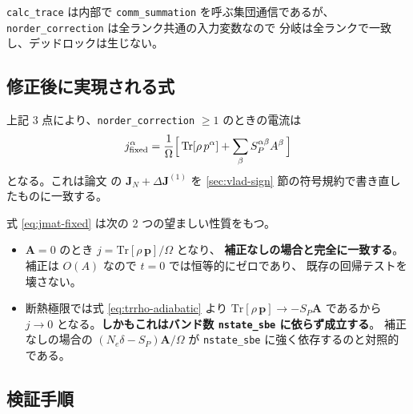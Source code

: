 \documentclass[dvipdfmx,a4paper,11pt]{jsarticle}
\newcommand{\file}[1]{\texttt{#1}}
\newcommand{\vA}{\bm{A}}
\newcommand{\vp}{\bm{p}}
\newcommand{\Tr}{\mathrm{Tr}}
\begin{document}
\verb|calc_trace| は内部で \verb|comm_summation| を呼ぶ集団通信であるが、
\file{norder\_correction} は全ランク共通の入力変数なので
分岐は全ランクで一致し、デッドロックは生じない。

\subsection{修正後に実現される式}

上記 3 点により、\file{norder\_correction} $\ge 1$ のときの電流は
%
\begin{equation}
  j^\alpha_{\text{fixed}}
  = \frac{1}{\Omega}\Bigl[\,\Tr[\rho\,p^\alpha]
    + \sum_\beta S_P^{\alpha\beta}A^\beta \,\Bigr]
  \label{eq:jmat-fixed}
\end{equation}
%
となる。これは論文 \cite{yakovlev2017} の
$\mathbf{J}_N + \Delta\mathbf{J}^{(1)}$ を
\ref{sec:vlad-sign} 節の符号規約で書き直したものに一致する。

式 \eqref{eq:jmat-fixed} は次の 2 つの望ましい性質をもつ。

\begin{itemize}
\item $\vA = 0$ のとき $j = \Tr[\rho\,\vp]/\Omega$ となり、
      \textbf{補正なしの場合と完全に一致する}。
      補正は $O(A)$ なので $t=0$ では恒等的にゼロであり、
      既存の回帰テストを壊さない。
\item 断熱極限では式 \eqref{eq:trrho-adiabatic} より
      $\Tr[\rho\,\vp]\to -S_P\vA$ であるから
      $j\to 0$ となる。\textbf{しかもこれはバンド数
      \file{nstate\_sbe} に依らず成立する}。
      補正なしの場合の $(N_e\delta - S_P)\vA/\Omega$ が
      \file{nstate\_sbe} に強く依存するのと対照的である。
\end{itemize}

\subsection{検証手順}
\end{document}
